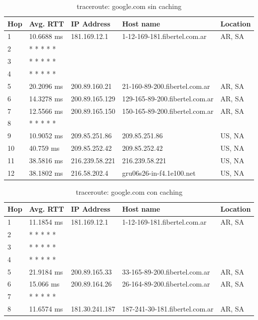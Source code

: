 \begin{table}[H]
\caption{traceroute: google.com sin caching}
\centering
\begin{tabular}{@{}l|llll@{}}
\toprule
Hop & Avg. RTT & IP Address & Host name & Location\\ \midrule
1 & 10.6688 ms & 181.169.12.1 & 1-12-169-181.fibertel.com.ar & AR, SA\\
2 &  * * * * * &  &  &  \\
3 &  * * * * * &  &  &  \\
4 &  * * * * * &  &  &  \\
5 & 20.2096 ms & 200.89.160.21 & 21-160-89-200.fibertel.com.ar & AR, SA\\
6 & 14.3278 ms & 200.89.165.129 & 129-165-89-200.fibertel.com.ar & AR, SA\\
7 & 12.5566 ms & 200.89.165.150 & 150-165-89-200.fibertel.com.ar & AR, SA\\
8 &  * * * * * &  &  &  \\
9 & 10.9052 ms & 209.85.251.86 & 209.85.251.86 & US, NA\\
10 & 40.759 ms & 209.85.252.42 & 209.85.252.42 & US, NA\\
11 & 38.5816 ms & 216.239.58.221 & 216.239.58.221 & US, NA\\
12 & 38.1802 ms & 216.58.202.4 & gru06s26-in-f4.1e100.net & US, NA\\ \bottomrule
\end{tabular}
\label{google}
\end{table}


\begin{table}[H]
\caption{traceroute: google.com con caching}
\centering
\begin{tabular}{@{}l|llll@{}}
\toprule
Hop & Avg. RTT & IP Address & Host name & Location\\ \midrule
1 & 11.1854 ms & 181.169.12.1 & 1-12-169-181.fibertel.com.ar & AR, SA\\
2 &  * * * * * &  &  &  \\
3 &  * * * * * &  &  &  \\
4 &  * * * * * &  &  &  \\
5 & 21.9184 ms & 200.89.165.33 & 33-165-89-200.fibertel.com.ar & AR, SA\\
6 & 15.066 ms & 200.89.164.26 & 26-164-89-200.fibertel.com.ar & AR, SA\\
7 &  * * * * * &  &  &  \\
8 & 11.6574 ms & 181.30.241.187 & 187-241-30-181.fibertel.com.ar & AR, SA\\ \bottomrule
\end{tabular}
\label{googlecache}
\end{table}